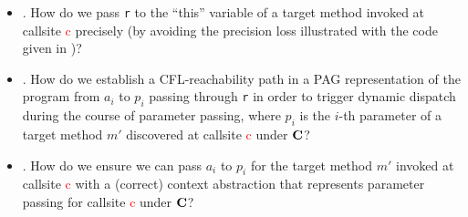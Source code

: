  \begin{itemize}[leftmargin=*]
 \item  {}.  How do we pass \texttt{r} to the  ``this'' variable of a target method invoked at callsite \textcolor{red}{c} 
 precisely (by avoiding
the precision loss illustrated with the code given in )?
 
  \item  {}.  
  How do we establish a CFL-reachability path in a PAG representation of the program
  from   $a_i$ to $p_i$ passing through \texttt{r} in order to trigger
  dynamic dispatch during the course of parameter passing, where
  $p_i$ is the $i$-th parameter of a target method $m'$ discovered 
  at callsite \textcolor{red}{c} under  $\textbf{C}$?
 

 
 \item {}. How
 do we ensure we can pass $a_i$ to $p_i$ for the target method $m'$ invoked 
at callsite \textcolor{red}{c}
 with a (correct) context abstraction that represents parameter passing
 for callsite \textcolor{red}{c}
  under $\textbf{C}$?
 


 
 
  \end{itemize}

